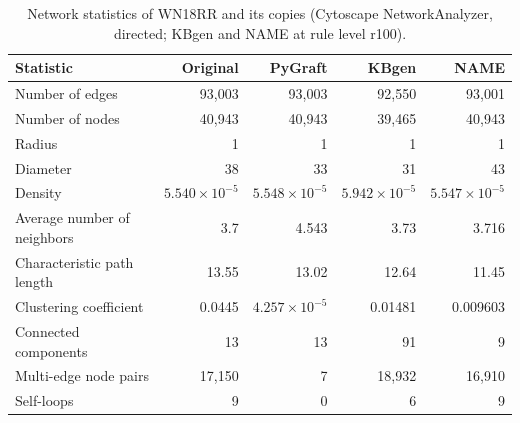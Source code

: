 \begin{table}[t]
\centering
\caption{Network statistics of WN18RR and its copies (Cytoscape NetworkAnalyzer, directed; KBgen and NAME at rule level r100).}
\label{tab:cytoscape_WN18RR}
\begin{tabular}{lrrrr}
\toprule
Statistic & Original & PyGraft & KBgen & NAME \\
\midrule
Number of edges & 93{,}003 & 93{,}003 & 92{,}550 & 93{,}001 \\
Number of nodes & 40{,}943 & 40{,}943 & 39{,}465 & 40{,}943 \\
Radius & 1 & 1 & 1 & 1 \\
Diameter & 38 & 33 & 31 & 43 \\
Density & $5.540\times10^{-5}$ & $5.548\times10^{-5}$ & $5.942\times10^{-5}$ & $5.547\times10^{-5}$ \\
Average number of neighbors & 3.7 & 4.543 & 3.73 & 3.716 \\
Characteristic path length & 13.55 & 13.02 & 12.64 & 11.45 \\
Clustering coefficient & 0.0445 & $4.257\times10^{-5}$ & 0.01481 & 0.009603 \\
Connected components & 13 & 13 & 91 & 9 \\
Multi-edge node pairs & 17{,}150 & 7 & 18{,}932 & 16{,}910 \\
Self-loops & 9 & 0 & 6 & 9 \\
\bottomrule
\end{tabular}
\end{table}
